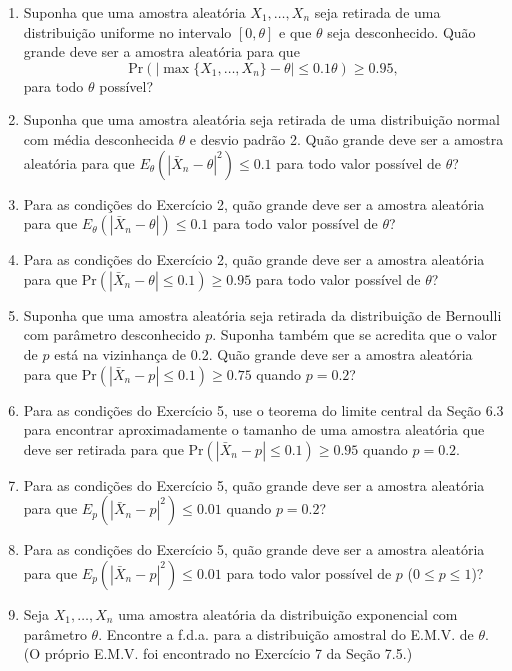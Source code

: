 \begin{enumerate}
    \item Suponha que uma amostra aleatória $X_1, \dots, X_n$ seja retirada de uma distribuição uniforme no intervalo $[0, \theta]$ e que $\theta$ seja desconhecido. Quão grande deve ser a amostra aleatória para que
    $$ \text{Pr}(|\max\{X_1, \dots, X_n\} - \theta| \le 0.1\theta) \ge 0.95, $$
    para todo $\theta$ possível?

    \item Suponha que uma amostra aleatória seja retirada de uma distribuição normal com média desconhecida $\theta$ e desvio padrão 2. Quão grande deve ser a amostra aleatória para que $E_\theta(|\bar{X}_n - \theta|^2) \le 0.1$ para todo valor possível de $\theta$?

    \item Para as condições do Exercício 2, quão grande deve ser a amostra aleatória para que $E_\theta(|\bar{X}_n - \theta|) \le 0.1$ para todo valor possível de $\theta$?

    \item Para as condições do Exercício 2, quão grande deve ser a amostra aleatória para que $\text{Pr}(|\bar{X}_n - \theta| \le 0.1) \ge 0.95$ para todo valor possível de $\theta$?

    \item Suponha que uma amostra aleatória seja retirada da distribuição de Bernoulli com parâmetro desconhecido $p$. Suponha também que se acredita que o valor de $p$ está na vizinhança de 0.2. Quão grande deve ser a amostra aleatória para que $\text{Pr}(|\bar{X}_n - p| \le 0.1) \ge 0.75$ quando $p=0.2$?

    \item Para as condições do Exercício 5, use o teorema do limite central da Seção 6.3 para encontrar aproximadamente o tamanho de uma amostra aleatória que deve ser retirada para que $\text{Pr}(|\bar{X}_n - p| \le 0.1) \ge 0.95$ quando $p=0.2$.

    \item Para as condições do Exercício 5, quão grande deve ser a amostra aleatória para que $E_p(|\bar{X}_n - p|^2) \le 0.01$ quando $p=0.2$?

    \item Para as condições do Exercício 5, quão grande deve ser a amostra aleatória para que $E_p(|\bar{X}_n - p|^2) \le 0.01$ para todo valor possível de $p$ ($0 \le p \le 1$)?

    \item Seja $X_1, \dots, X_n$ uma amostra aleatória da distribuição exponencial com parâmetro $\theta$. Encontre a f.d.a. para a distribuição amostral do E.M.V. de $\theta$. (O próprio E.M.V. foi encontrado no Exercício 7 da Seção 7.5.)

\end{enumerate}